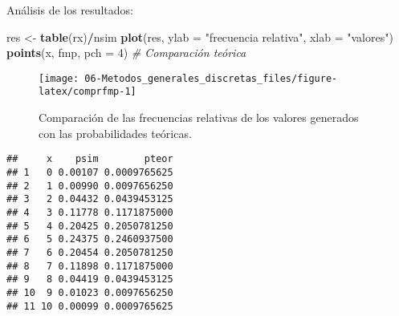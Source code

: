 \documentclass[
]{book}
\newenvironment{Shaded}{\begin{snugshade}}{\end{snugshade}}
\newcommand{\CommentTok}[1]{\textcolor[rgb]{0.56,0.35,0.01}{\textit{#1}}}
\newcommand{\DataTypeTok}[1]{\textcolor[rgb]{0.13,0.29,0.53}{#1}}
\newcommand{\DecValTok}[1]{\textcolor[rgb]{0.00,0.00,0.81}{#1}}
\newcommand{\KeywordTok}[1]{\textcolor[rgb]{0.13,0.29,0.53}{\textbf{#1}}}
\newcommand{\NormalTok}[1]{#1}
\newcommand{\OperatorTok}[1]{\textcolor[rgb]{0.81,0.36,0.00}{\textbf{#1}}}
\newcommand{\StringTok}[1]{\textcolor[rgb]{0.31,0.60,0.02}{#1}}
\theoremstyle{break}
\theoremstyle{definition}
\theoremstyle{definition}
\theoremstyle{definition}
\theoremstyle{remark}
\begin{document}
Análisis de los resultados:

\begin{Shaded}
\begin{Highlighting}[]
\NormalTok{res <-}\StringTok{ }\KeywordTok{table}\NormalTok{(rx)}\OperatorTok{/}\NormalTok{nsim}
\KeywordTok{plot}\NormalTok{(res, }\DataTypeTok{ylab =} \StringTok{"frecuencia relativa"}\NormalTok{, }\DataTypeTok{xlab =} \StringTok{"valores"}\NormalTok{)}
\KeywordTok{points}\NormalTok{(x, fmp, }\DataTypeTok{pch =} \DecValTok{4}\NormalTok{)  }\CommentTok{# Comparación teórica}
\end{Highlighting}
\end{Shaded}

\begin{figure}[!htb]

{\centering \texttt{[image: 06-Metodos\_generales\_discretas\_files/figure-latex/comprfmp-1]} 

}

\caption{Comparación de las frecuencias relativas de los valores generados con las probabilidades teóricas.}\label{fig:comprfmp}
\end{figure}

\begin{Shaded}
\end{Shaded}

\begin{verbatim}
##     x    psim        pteor
## 1   0 0.00107 0.0009765625
## 2   1 0.00990 0.0097656250
## 3   2 0.04432 0.0439453125
## 4   3 0.11778 0.1171875000
## 5   4 0.20425 0.2050781250
## 6   5 0.24375 0.2460937500
## 7   6 0.20454 0.2050781250
## 8   7 0.11898 0.1171875000
## 9   8 0.04419 0.0439453125
## 10  9 0.01023 0.0097656250
## 11 10 0.00099 0.0009765625
\end{verbatim}

\begin{Shaded}
\end{Shaded}
\end{document}
